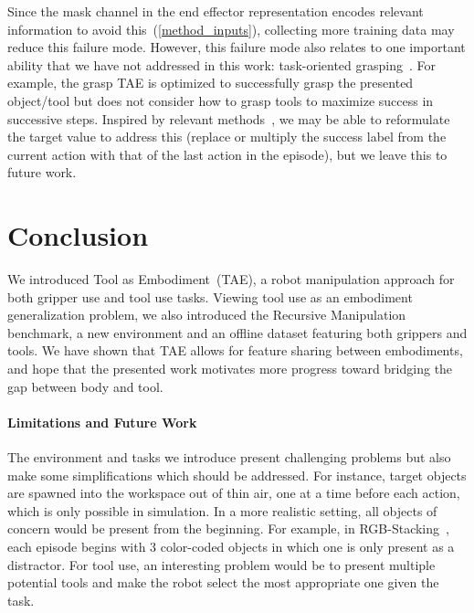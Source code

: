 \documentclass[10pt,twocolumn,letterpaper]{article}
\newcommand{\shane}[1]{{\color{red}{SHANE: #1}}}
\begin{document}
Since the mask channel in the end effector representation encodes relevant information to avoid this~(\cref{method_inputs}), collecting more training data may reduce this failure mode. However, this failure mode also relates to one important ability that we have not addressed in this work: task-oriented grasping~\cite{fang2020learning}. For example, the grasp TAE is optimized to successfully grasp the presented object/tool but does not consider how to grasp tools to maximize success in successive steps. Inspired by relevant methods~\cite{fang2020learning, zeng2018learning}, we may be able to reformulate the target value to address this (\eg replace or multiply the success label from the current action with that of the last action in the episode), but we leave this to future work.

\section{Conclusion}

We introduced Tool as Embodiment~(TAE), a robot manipulation approach for both gripper use and tool use tasks. Viewing tool use as an embodiment generalization problem, we also introduced the Recursive Manipulation benchmark, a new environment and an offline dataset featuring both grippers and tools. We have shown that TAE allows for feature sharing between embodiments, and hope that the presented work motivates more progress toward bridging the gap between body and tool.

\paragraph{Limitations and Future Work}%

The environment and tasks we introduce present challenging problems but also make some simplifications which should be addressed. For instance, target objects are spawned into the workspace out of thin air, one at a time before each action, which is only possible in simulation. In a more realistic setting, all objects of concern would be present from the beginning. For example, in RGB-Stacking~\cite{lee2021rgbstacking}, each episode begins with 3 color-coded objects in which one is only present as a distractor. For tool use, an interesting problem would be to present multiple potential tools and make the robot select the most appropriate one given the task.

\end{document}

